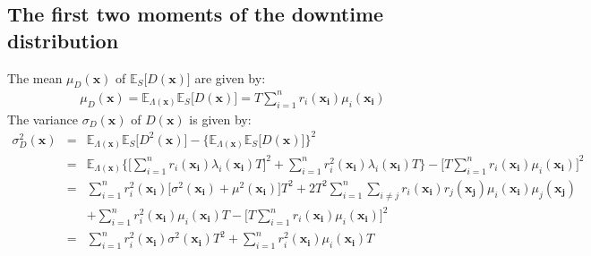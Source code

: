 \documentclass[preprint,12pt]{elsarticle}
\begin{document}
\subsection{The first two moments of the downtime distribution}
The mean $\mu_{D}(\boldsymbol{x})$ of $\mathbb{E}_{S}\bigg[D(\boldsymbol{x})\bigg]$ are given by:
\begin{eqnarray}
\mu_{D}(\boldsymbol{x})=\mathbb{E}_{\Lambda(\boldsymbol{x})}\mathbb{E}_{S} \bigg[D(\boldsymbol{x}) \bigg]=T\sum_{i=1}^{n}{r_{i}(\boldsymbol{x_i})\mu_{i}(\boldsymbol{x_i})}
\label{muD}
\end{eqnarray}
The variance $\sigma_{D}(\boldsymbol{x})$ of $D(\boldsymbol{x})$ is given by:
\begin{eqnarray}
\sigma^{2}_{D}(\boldsymbol{x})&=&\mathbb{E}_{\Lambda(\boldsymbol{x})}\mathbb{E}_{S} \bigg[D^{2}(\boldsymbol{x}) \bigg]- \bigg\{\mathbb{E}_{\Lambda(\boldsymbol{x})}\mathbb{E}_{S}\bigg[D(\boldsymbol{x}) \bigg] \bigg\}^{2} \nonumber\\
&=& \mathbb{E}_{\Lambda(\boldsymbol{x})}\bigg\{\bigg[\sum_{i=1}^{n}{r_{i}(\boldsymbol{x_{i}})\lambda_{i}(\boldsymbol{x_{i}})T}\bigg]^{2} +\sum_{i=1}^{n}{r_{i}^{2}(\boldsymbol{x_{i}})\lambda_{i}(\boldsymbol{x_{i}})T} \bigg\}-\bigg[T\sum_{i=1}^{n}{r_{i}(\boldsymbol{x_i})\mu_{i}(\boldsymbol{x_i})}\bigg]^{2}\nonumber\\
&=& \sum_{i=1}^{n}{r_{i}^{2}(\boldsymbol{x_{i}})\bigg[\sigma^{2}(\boldsymbol{x_{i}})+\mu^{2}(\boldsymbol{x_{i}})\bigg]T^{2}}+2T^{2}\sum_{i=1}^{n}\sum_{i\ne j}{r_{i}(\boldsymbol{x_{i}})r_{j}(\boldsymbol{x_{j}})\mu_{i}(\boldsymbol{x_{i}})\mu_{j}(\boldsymbol{x_{j}})} \nonumber\\
&& +\sum_{i=1}^{n}{r_{i}^{2}(\boldsymbol{x_{i}})\mu_{i}(\boldsymbol{x_{i}})T} - \bigg[T\sum_{i=1}^{n}{r_{i}(\boldsymbol{x_i})\mu_{i}(\boldsymbol{x_i})}\bigg]^{2} \nonumber\\
&=&\sum_{i=1}^{n}{r_{i}^{2}(\boldsymbol{x_{i}})\sigma^{2}(\boldsymbol{x_{i}})T^{2}}+\sum_{i=1}^{n}{r_{i}^{2}(\boldsymbol{x_{i}})\mu_{i}(\boldsymbol{x_{i}})T}
\end{eqnarray}
\end{document}
